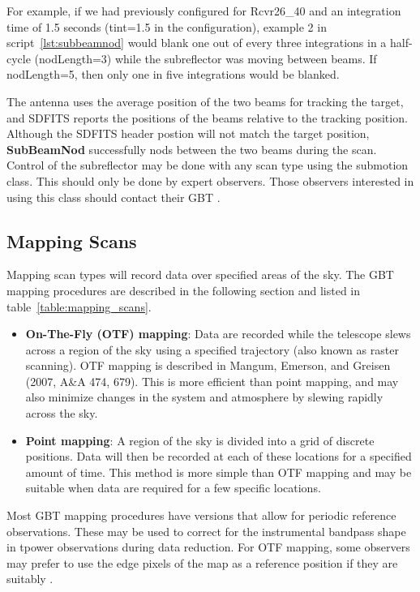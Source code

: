 For example, if we had previously configured for Rcvr26\_40 and an integration
time of 1.5 seconds (tint=1.5 in the configuration), example 2 in
script~\ref{lst:subbeamnod} would blank one out of every three integrations
in a half-cycle (nodLength=3) while the subreflector was moving between beams.
If nodLength=5, then only one in five integrations would be blanked.

The antenna uses the average position of the two beams for tracking the target,
and SDFITS reports the positions of the beams relative to the tracking position.
Although the SDFITS header postion will not match the target position,
{\bfseries{\textcolor{pythonKeywords}{SubBeamNod}}} successfully nods
between the two beams during the scan.  Control of the subreflector
may be done with any scan type using the submotion class.  This should
only be done by expert observers.  Those observers interested in using
this class should contact their \gls{GBT} .


\newpage

\subsection{Mapping Scans}\label{sec:mappingscans}

Mapping scan types will record data over specified areas of the sky.
The \gls{GBT} mapping procedures are described in the following section
and listed in table~\ref{table:mapping_scans}.

\begin{itemize}[leftmargin=*]
\item {\bf On-The-Fly (OTF) mapping}: Data are recorded while the telescope
slews across a region of the sky using a specified trajectory (also known as
raster scanning). \gls{OTF} mapping is described in Mangum, Emerson, and
Greisen (2007, A\&A 474, 679).  This is more efficient than point mapping,
and may also minimize changes in the system and atmosphere by slewing rapidly
across the sky.
\item {\bf Point mapping}: A region of the sky is divided into a grid of
discrete positions.  Data will then be recorded at each of these locations
for a specified amount of time.  This method is more simple than \gls{OTF}
mapping and may be suitable when data are required for a few specific
locations.
\end{itemize}

Most \gls{GBT} mapping procedures have versions that allow for
periodic reference observations.  These may be used to correct for the
instrumental bandpass shape in \gls{tpower} observations during data
reduction.  For \gls{OTF} mapping, some observers may prefer to use
the edge pixels of the map as a reference position if they are suitably
.

